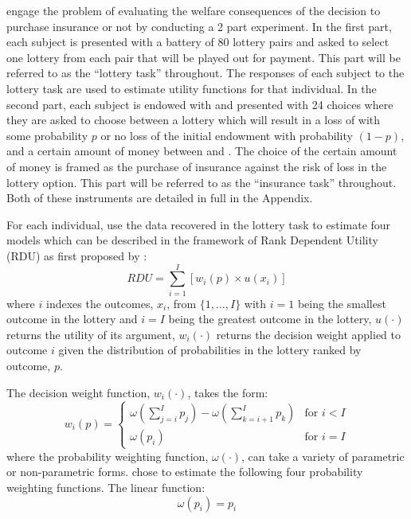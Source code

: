 \documentclass[../main.tex]{subfiles}
\begin{document}
\textcite{Harrison2016} engage the problem of evaluating the welfare consequences of the decision to purchase insurance or not by conducting a 2 part experiment.
In the first part, each subject is presented with a battery of 80 lottery pairs and asked to select one lottery from each pair that will be played out for payment.
This part will be referred to as the \enquote{lottery task} throughout.
The responses of each subject to the lottery task are used to estimate utility functions for that individual.
In the second part, each subject is endowed with  and presented with 24 choices where they are asked to choose between a lottery which will result in a loss of  with some probability $p$ or no loss of the initial endowment with probability $(1-p)$, and a certain amount of money between  and .
The choice of the certain amount of money is framed as the purchase of insurance against the risk of loss in the lottery option.
This part will be referred to as the \enquote{insurance task} throughout.
Both of these instruments are detailed in full in the Appendix.

For each individual, \textcite{Harrison2016} use the data recovered in the lottery task to estimate four models which can be described in the framework of Rank Dependent Utility (RDU) as first proposed by \textcite{Quiggin1982}:
\begin{equation}
	\label{eq4:RDU}
	RDU = \sum_{i=1}^{I} \left[ w_i(p) \times u(x_i) \right]
\end{equation}
\noindent where $i$ indexes the outcomes, $x_i$, from $\{1,\ldots,I\}$ with $i=1$ being the smallest outcome in the lottery and $i=I$ being the greatest outcome in the lottery, $u(\cdot)$ returns the utility of its argument, $w_i(\cdot)$ returns the decision weight applied to outcome $i$ given the distribution of probabilities in the lottery ranked by outcome, $p$.

The decision weight function, $w_i(\cdot)$, takes the form:
\begin{equation}
	\label{eq4:dweight}
	w_i(p) =
	\begin{cases}
		\omega\left(\displaystyle\sum_{j=i}^I p_j\right) - \omega\left(\displaystyle\sum_{k=i+1}^I p_k\right) & \text{for } i<I \\
		\omega(p_i) & \text{for } i = I
	\end{cases}
\end{equation}
\noindent where the probability weighting function, $\omega(\cdot)$, can take a variety of parametric or non-parametric forms.
\textcite{Harrison2016} chose to estimate the following four probability weighting functions. The linear function:
\begin{equation}
	\label{eq4:pw:eut}
	\omega(p_i) = p_i
\end{equation}
\end{document}
